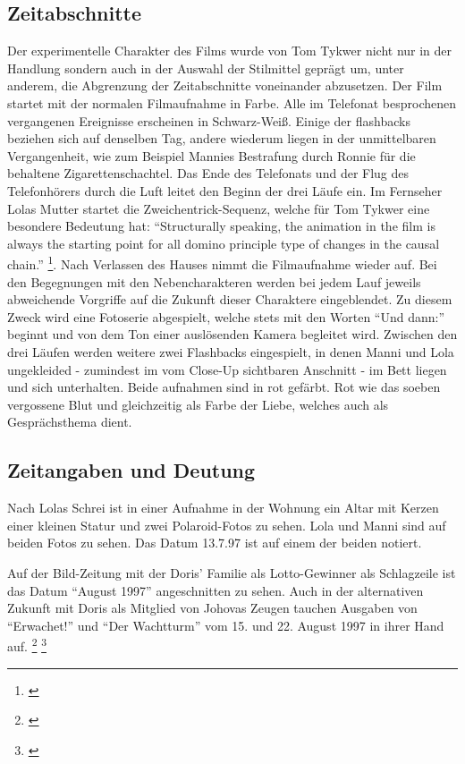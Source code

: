 \subsection{Zeitabschnitte}

Der experimentelle Charakter des Films wurde von Tom Tykwer nicht nur in der Handlung sondern auch in der Auswahl der Stilmittel geprägt um, unter anderem, die Abgrenzung der Zeitabschnitte voneinander abzusetzen. Der Film startet mit der normalen Filmaufnahme in Farbe. Alle im Telefonat besprochenen vergangenen Ereignisse erscheinen in Schwarz-Weiß. Einige der flashbacks beziehen sich auf denselben Tag, andere wiederum liegen in der unmittelbaren Vergangenheit, wie zum Beispiel Mannies Bestrafung durch Ronnie für die behaltene Zigarettenschachtel. Das Ende des Telefonats und der Flug des Telefonhörers durch die Luft leitet den Beginn der drei Läufe ein. Im Fernseher Lolas Mutter startet die Zweichentrick-Sequenz, welche für Tom Tykwer eine besondere Bedeutung hat: “Structurally speaking, the animation in the film is always the starting point for all domino principle type of changes in the causal chain.” \footnote{\cite{AnythingRuns}}. Nach Verlassen des Hauses nimmt die Filmaufnahme wieder auf. Bei den Begegnungen mit den Nebencharakteren werden bei jedem Lauf jeweils abweichende Vorgriffe auf die Zukunft dieser Charaktere eingeblendet. Zu diesem Zweck wird eine Fotoserie abgespielt, welche stets mit den Worten "`Und dann:"' beginnt und von dem Ton einer auslösenden Kamera begleitet wird. Zwischen den drei Läufen werden weitere zwei Flashbacks eingespielt, in denen Manni und Lola ungekleided - zumindest im vom Close-Up sichtbaren Anschnitt - im Bett liegen und sich unterhalten. Beide aufnahmen sind in rot gefärbt. Rot wie das soeben vergossene Blut und gleichzeitig als Farbe der Liebe, welches auch als Gesprächsthema dient. 

\subsection{Zeitangaben und Deutung}

Nach Lolas Schrei ist in einer Aufnahme in der Wohnung ein Altar mit Kerzen einer kleinen Statur und zwei Polaroid-Fotos zu sehen. Lola und Manni sind auf beiden Fotos zu sehen. Das Datum 13.7.97 ist auf einem der beiden notiert.

Auf der Bild-Zeitung mit der Doris' Familie als Lotto-Gewinner als Schlagzeile ist das Datum "`August 1997"' angeschnitten zu sehen. Auch in der alternativen Zukunft mit Doris als Mitglied von Johovas Zeugen tauchen Ausgaben von "`Erwachet!"' und "`Der Wachtturm"' vom 15. und 22. August 1997 in ihrer Hand auf. \footnote{\cite{Rettung}} \footnote{\cite{DieWasserkriseEinWeltweitesProblem}} 

